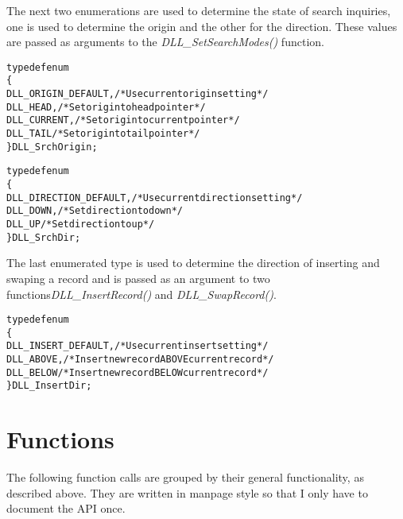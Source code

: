 \documentclass[10pt,letterpaper]{report}
\begin{document}
\noindent
The next two enumerations are used to determine the state of search inquiries, one is used to determine the origin and the other for the direction.  These values are passed as arguments to the \emph{DLL\_SetSearchModes()} function.

\small
\begin{alltt}
typedef enum
   \{
   DLL_ORIGIN_DEFAULT,    /* Use current origin setting */
   DLL_HEAD,              /* Set origin to head pointer */
   DLL_CURRENT,           /* Set origin to current pointer */
   DLL_TAIL               /* Set origin to tail pointer */
   \} DLL_SrchOrigin;

typedef enum
   \{
   DLL_DIRECTION_DEFAULT, /* Use current direction setting */
   DLL_DOWN,              /* Set direction to down */
   DLL_UP                 /* Set direction to up */
   \} DLL_SrchDir;
\end{alltt}
\normalsize
\vspace{8pt}

\noindent
The last enumerated type is used to determine the direction of inserting and swaping a record and is passed as an argument to two functions\linebreak \emph{DLL\_InsertRecord()} and \emph{DLL\_SwapRecord()}.

\small
\begin{alltt}
typedef enum
   \{
   DLL_INSERT_DEFAULT,    /* Use current insert setting */
   DLL_ABOVE,             /* Insert new record ABOVE current record */
   DLL_BELOW              /* Insert new record BELOW current record */
   \} DLL_InsertDir;
\end{alltt}
\normalsize

\chapter*{Functions}
The following function calls are grouped by their general functionality, as described above.  They are written in manpage style so that I only have to document the API once.
\end{document}
